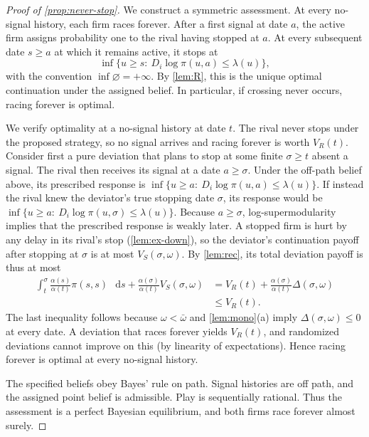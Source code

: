 \documentclass[12pt,reqno]{article}
\newcommand{\de}{\mathop{}\!\mathrm{d}}
\theoremstyle{definition} \newtheorem{example}{Example}
\theoremstyle{definition} \newtheorem{condition}{Condition}
\theoremstyle{definition} \newtheorem{corollary}{Corollary}
\theoremstyle{definition} \newtheorem{claim}{Claim}
\theoremstyle{definition} \newtheorem{definition}{Definition}
\theoremstyle{definition} \newtheorem{conjecture}{Conjecture}
\theoremstyle{definition} \newtheorem{Lemma}{Lemma}
\theoremstyle{definition} \newtheorem{lemma}{Lemma}
\theoremstyle{plain} \newtheorem{theorem}{Theorem}
\theoremstyle{definition} \newtheorem{assumption}{Assumption}
\theoremstyle{definition} \newtheorem*{assumptionnonumber}{Assumption}
\theoremstyle{definition} \newtheorem*{theoremNoNumber}{Proposition}
\theoremstyle{definition}
\theoremstyle{definition}\newtheorem{proposition}{Proposition}
\theoremstyle{definition} \newtheorem{result}{Result}
\theoremstyle{definition} \newtheorem*{definitionNoNumber}{Definition}
\theoremstyle{definition} \newtheorem{Definition}{Definition}
\theoremstyle{definition} \newtheorem*{DefinitionNoNumber}{Definition}
\theoremstyle{definition} \newtheorem*{fact}{Fact}
\theoremstyle{definition} \newtheorem*{property}{Property}
\theoremstyle{definition} \newtheorem{remark}{Remark}
\begin{document}
\begin{proof}[Proof of \cref{prop:never-stop}]
We construct a symmetric assessment. At every no-signal history, each firm races forever. After a first signal at date $a$, the active firm assigns probability one to the rival having stopped at $a$. At every subsequent date $s\ge a$ at which it remains active, it stops at
\[
\inf\big\{u\ge s:\ D_i\log\pi(u,a)\le\lambda(u)\big\},
\]
with the convention $\inf\varnothing=+\infty$. By \cref{lem:R}, this is the unique optimal continuation under the assigned belief. In particular, if crossing never occurs, racing forever is optimal.

We verify optimality at a no-signal history at date $t$. The rival never stops under the proposed strategy, so no signal arrives and racing forever is worth $V_R(t)$. Consider first a pure deviation that plans to stop at some finite $\sigma\ge t$ absent a signal. The rival then receives its signal at a date $a\ge\sigma$. Under the off-path belief above, its prescribed response is
$
\inf\big\{u\ge a:\ D_i\log\pi(u,a)\le\lambda(u)\big\}.$
If instead the rival knew the deviator's true stopping date $\sigma$, its response would be
$
\inf\big\{u\ge a:\ D_i\log\pi(u,\sigma)\le\lambda(u)\big\}.
$
Because $a\ge\sigma$, log-supermodularity implies that the prescribed response is weakly later. A stopped firm is hurt by any delay in its rival's stop (\cref{lem:ex-down}), so the deviator's continuation payoff after stopping at $\sigma$ is at most $V_S(\sigma,\omega)$. By \cref{lem:rec}, its total deviation payoff is thus at most
\begin{align*}
\int_t^\sigma\frac{\alpha(s)}{\alpha(t)}\pi(s,s)\,\de s
+\frac{\alpha(\sigma)}{\alpha(t)}V_S(\sigma,\omega)
&=V_R(t)+\frac{\alpha(\sigma)}{\alpha(t)}\Delta(\sigma,\omega)\\
&\le V_R(t).
\end{align*}
The last inequality follows because $\omega<\bar\omega$ and \cref{lem:mono}(a) imply $\Delta(\sigma,\omega)\le0$ at every date. A deviation that races forever yields   $V_R(t)$, and randomized deviations cannot improve on this (by linearity of expectations). Hence racing forever is optimal at every no-signal history.

The specified beliefs obey Bayes' rule on path. Signal histories are off path, and the assigned point belief is admissible. Play is sequentially rational. Thus the assessment is a perfect Bayesian equilibrium, and both firms race forever almost surely.
\end{proof}
\end{document}
